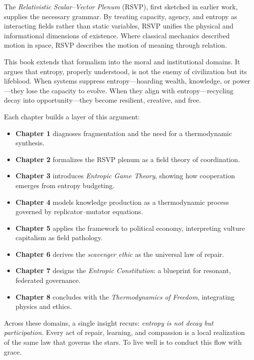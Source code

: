 \documentclass[11pt,a4paper,titlepage]{article}
\theoremstyle{definition}
\begin{document}
The \emph{Relativistic Scalar–Vector Plenum} (RSVP), first sketched in earlier work, supplies the necessary grammar.  
By treating capacity, agency, and entropy as interacting fields rather than static variables, RSVP unifies the physical and informational dimensions of existence.  
Where classical mechanics described motion in space, RSVP describes the motion of meaning through relation.

This book extends that formalism into the moral and institutional domains.  
It argues that entropy, properly understood, is not the enemy of civilization but its lifeblood.  
When systems suppress entropy—hoarding wealth, knowledge, or power—they lose the capacity to evolve.  
When they align with entropy—recycling decay into opportunity—they become resilient, creative, and free.

Each chapter builds a layer of this argument:

\begin{itemize}[leftmargin=2em]
  \item \textbf{Chapter 1} diagnoses fragmentation and the need for a thermodynamic synthesis.
  \item \textbf{Chapter 2} formalizes the RSVP plenum as a field theory of coordination.
  \item \textbf{Chapter 3} introduces \emph{Entropic Game Theory}, showing how cooperation emerges from entropy budgeting.
  \item \textbf{Chapter 4} models knowledge production as a thermodynamic process governed by replicator–mutator equations.
  \item \textbf{Chapter 5} applies the framework to political economy, interpreting vulture capitalism as field pathology.
  \item \textbf{Chapter 6} derives the \emph{scavenger ethic} as the universal law of repair.
  \item \textbf{Chapter 7} designs the \emph{Entropic Constitution}: a blueprint for resonant, federated governance.
  \item \textbf{Chapter 8} concludes with the \emph{Thermodynamics of Freedom}, integrating physics and ethics.
\end{itemize}

Across these domains, a single insight recurs:  
\emph{entropy is not decay but participation.}  
Every act of repair, learning, and compassion is a local realization of the same law that governs the stars.  
To live well is to conduct this flow with grace.
\end{document}
